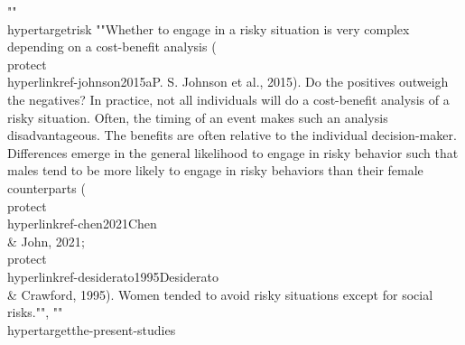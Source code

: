 {{{{{{{""\\hypertarget{risk}{%
""Whether to engage in a risky situation is very complex depending on a cost-benefit analysis (\\protect\\hyperlink{ref-johnson2015a}{P. S. Johnson et al., 2015}). Do the positives outweigh the negatives? In practice, not all individuals will do a cost-benefit analysis of a risky situation. Often, the timing of an event makes such an analysis disadvantageous. The benefits are often relative to the individual decision-maker. Differences emerge in the general likelihood to engage in risky behavior such that males tend to be more likely to engage in risky behaviors than their female counterparts (\\protect\\hyperlink{ref-chen2021}{Chen \\& John, 2021}; \\protect\\hyperlink{ref-desiderato1995}{Desiderato \\& Crawford, 1995}). Women tended to avoid risky situations except for social risks."", 
""\\hypertarget{the-present-studies}{%
}}}}}}}}}
